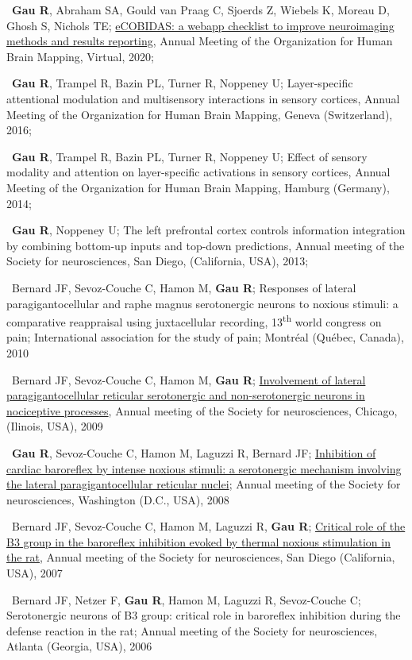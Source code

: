 \textbullet~\textbf{Gau R}, Abraham SA, Gould van Praag C, Sjoerds Z, Wiebels K, Moreau D, Ghosh S, Nichols TE;
\href{https://osf.io/k8pe6/}{eCOBIDAS: a webapp checklist to improve neuroimaging methods and results reporting},
Annual Meeting of the Organization for Human Brain Mapping, Virtual,
2020;

\textbullet~\textbf{Gau R}, Trampel R, Bazin PL, Turner R, Noppeney U;
Layer-specific attentional modulation and multisensory interactions in sensory cortices,
Annual Meeting of the Organization for Human Brain Mapping, Geneva (Switzerland),
2016;

\textbullet~\textbf{Gau R}, Trampel R, Bazin PL, Turner R, Noppeney U;
Effect of sensory modality and attention on layer-specific activations in sensory cortices,
Annual Meeting of the Organization for Human Brain Mapping, Hamburg (Germany),
2014;

\textbullet~\textbf{Gau R}, Noppeney U; The left prefrontal cortex controls information integration
by combining bottom-up inputs and top-down predictions,
Annual meeting of the Society for neurosciences,
San Diego, (California, USA),
2013;

\textbullet~Bernard JF, Sevoz-Couche C, Hamon M, \textbf{Gau R};
Responses of lateral paragigantocellular and raphe magnus serotonergic neurons to noxious stimuli:
a comparative reappraisal using juxtacellular recording,
13\textsuperscript{th} world congress on pain; International association for the study of pain;
Montréal (Québec, Canada),
2010

\textbullet~Bernard JF, Sevoz-Couche C, Hamon M, \textbf{Gau R};
\href{https://osf.io/efqub/}{Involvement of lateral paragigantocellular reticular serotonergic
and non-serotonergic neurons in nociceptive processes},
Annual meeting of the Society for neurosciences,
Chicago, (Ilinois, USA),
2009

\textbullet~\textbf{Gau R}, Sevoz-Couche C, Hamon M, Laguzzi R, Bernard JF;
\href{https://osf.io/hxkgv/}{Inhibition of cardiac baroreflex by intense noxious stimuli:
a serotonergic mechanism involving the lateral paragigantocellular reticular nuclei};
Annual meeting of the Society for neurosciences,
Washington (D.C., USA),
2008

\textbullet~Bernard JF, Sevoz-Couche C, Hamon M, Laguzzi R, \textbf{Gau R};
\href{https://osf.io/4rjst/}{Critical role of the B3 group in the baroreflex inhibition evoked
by thermal noxious stimulation in the rat},
Annual meeting of the Society for neurosciences,
San Diego (California, USA),
2007

\textbullet~Bernard JF, Netzer F, \textbf{Gau R}, Hamon M, Laguzzi R, Sevoz-Couche C;
Serotonergic neurons of B3 group: critical role in baroreflex inhibition
during the defense reaction in the rat;
Annual meeting of the Society for neurosciences,
Atlanta (Georgia, USA),
2006
